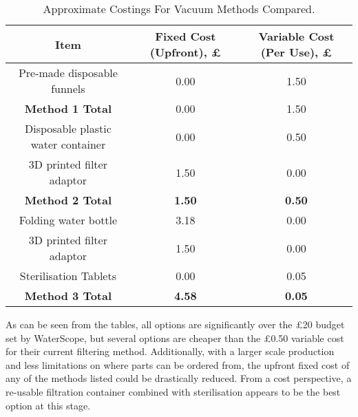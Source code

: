 \documentclass[12pt]{article}
\def\n{\noindent}
\begin{document}
\begin{table}[]
\centering
\begin{tabular}{|ccc|}
\hline
\multicolumn{1}{|c|}{\textbf{Item}}           & \multicolumn{1}{c|}{\textbf{Fixed Cost (Upfront), \pounds}} & \textbf{Variable Cost (Per Use), \pounds} \\ \hline
Pre-made disposable funnels                   & 0.00                                                  & 1.50                                \\ \hline
\multicolumn{1}{|c|}{\textbf{Method 1 Total}} & \multicolumn{1}{c|}{0.00}                             & 1.50                                \\ \hline
Disposable plastic water container            & 0.00                                                  & 0.50                                \\
3D printed filter adaptor                     & 1.50                                                  & 0.00                                \\ \hline
\multicolumn{1}{|c|}{\textbf{Method 2 Total}} & \multicolumn{1}{c|}{\textbf{1.50}}                    & \textbf{0.50}                       \\ \hline
Folding water bottle                          & 3.18                                                  & 0.00                                \\
3D printed filter adaptor                     & 1.50                                                  & 0.00                                \\
Sterilisation Tablets                         & 0.00                                                  & 0.05                                \\ \hline
\multicolumn{1}{|c|}{\textbf{Method 3 Total}} & \multicolumn{1}{c|}{\textbf{4.58}}                    & \textbf{0.05}                       \\ \hline
\end{tabular}
\caption{\label{tab:vacuumcost2}Approximate Costings For Vacuum Methods Compared.}
\end{table}
\n
As can be seen from the tables, all options are significantly over the \pounds20 budget set by WaterScope, but several options are cheaper than the \pounds0.50 variable cost for their current filtering method. Additionally, with a larger scale production and less limitations on where parts can be ordered from, the upfront fixed cost of any of the methods listed could be drastically reduced. From a cost perspective, a re-usable filtration container combined with sterilisation appears to be the best option at this stage.
\end{document}
